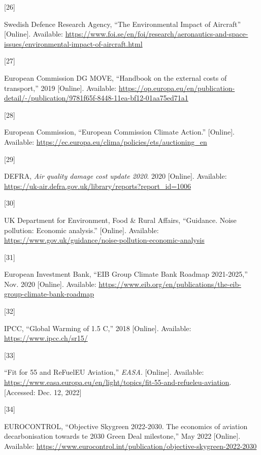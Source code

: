 \documentclass[
  11pt,
  a4paper,
]{book}
\newlength{\cslhangindent}
\newlength{\csllabelwidth}
\newlength{\cslentryspacingunit} %
\newenvironment{CSLReferences}[2] %
 {%
  \setlength{\parindent}{0pt}
  \ifodd #1
  \let\oldpar\par
  \def\par{\hangindent=\cslhangindent\oldpar}
  \fi
  \setlength{\parskip}{#2\cslentryspacingunit}
 }%
 {}
\newcommand{\CSLLeftMargin}[1]{\parbox[t]{\csllabelwidth}{#1}}
\newcommand{\CSLRightInline}[1]{\parbox[t]{\linewidth - \csllabelwidth}{#1}\break}
\begin{document}
\begin{CSLReferences}{0}{0}
\leavevmode{}%
\CSLLeftMargin{{[}26{]} }%
\CSLRightInline{Swedish Defence Research Agency, {``The {Environmental
Impact} of {Aircraft}''} {[}Online{]}. Available:
\url{https://www.foi.se/en/foi/research/aeronautics-and-space-issues/environmental-impact-of-aircraft.html}}

\leavevmode{}%
\CSLLeftMargin{{[}27{]} }%
\CSLRightInline{European Commission DG MOVE, {``Handbook on the external
costs of transport,''} 2019 {[}Online{]}. Available:
\url{https://op.europa.eu/en/publication-detail/-/publication/9781f65f-8448-11ea-bf12-01aa75ed71a1}}

\leavevmode{}%
\CSLLeftMargin{{[}28{]} }%
\CSLRightInline{European Commission, {``European {Commission Climate
Action}.''} {[}Online{]}. Available:
\url{https://ec.europa.eu/clima/policies/ets/auctioning_en}}

\leavevmode{}%
\CSLLeftMargin{{[}29{]} }%
\CSLRightInline{DEFRA, \emph{Air quality damage cost update 2020}. 2020
{[}Online{]}. Available:
\url{https://uk-air.defra.gov.uk/library/reports?report_id=1006}}

\leavevmode{}%
\CSLLeftMargin{{[}30{]} }%
\CSLRightInline{UK Department for Environment, Food \& Rural Affairs,
{``Guidance. {Noise} pollution: Economic analysis.''} {[}Online{]}.
Available:
\url{https://www.gov.uk/guidance/noise-pollution-economic-analysis}}

\leavevmode{}%
\CSLLeftMargin{{[}31{]} }%
\CSLRightInline{European Investment Bank, {``{EIB Group Climate Bank
Roadmap} 2021-2025,''} Nov. 2020 {[}Online{]}. Available:
\url{https://www.eib.org/en/publications/the-eib-group-climate-bank-roadmap}}

\leavevmode{}%
\CSLLeftMargin{{[}32{]} }%
\CSLRightInline{IPCC, {``Global {Warming} of 1.5
{\textordmasculine C},''} 2018 {[}Online{]}. Available:
\url{https://www.ipcc.ch/sr15/}}

\leavevmode{}%
\CSLLeftMargin{{[}33{]} }%
\CSLRightInline{{``Fit for 55 and {ReFuelEU Aviation},''} \emph{EASA}.
{[}Online{]}. Available:
\url{https://www.easa.europa.eu/en/light/topics/fit-55-and-refueleu-aviation}.
{[}Accessed: Dec. 12, 2022{]}}

\leavevmode{}%
\CSLLeftMargin{{[}34{]} }%
\CSLRightInline{EUROCONTROL, {``Objective {Skygreen} 2022-2030. {The}
economics of aviation decarbonisation towards te 2030 {Green Deal}
milestone,''} May 2022 {[}Online{]}. Available:
\url{https://www.eurocontrol.int/publication/objective-skygreen-2022-2030}}


\end{CSLReferences}
\end{document}
